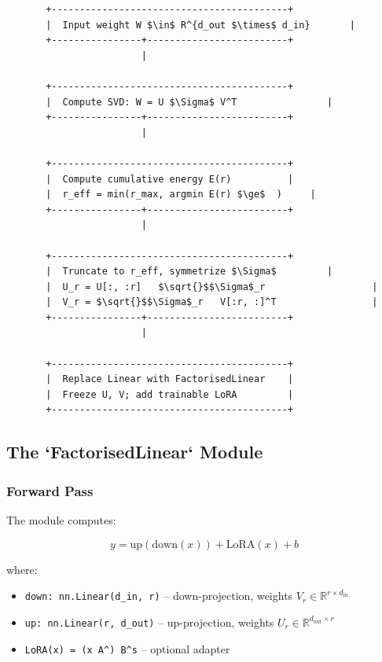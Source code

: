 \begin{lstlisting}
       +------------------------------------------+
       |  Input weight W $\in$ R^{d_out $\times$ d_in}       |
       +----------------+-------------------------+
                        |
                         
       +------------------------------------------+
       |  Compute SVD: W = U $\Sigma$ V^T                |
       +----------------+-------------------------+
                        |
                         
       +------------------------------------------+
       |  Compute cumulative energy E(r)          |
       |  r_eff = min(r_max, argmin E(r) $\ge$  )     |
       +----------------+-------------------------+
                        |
                         
       +------------------------------------------+
       |  Truncate to r_eff, symmetrize $\Sigma$         |
       |  U_r = U[:, :r]   $\sqrt{}$$\Sigma$_r                   |
       |  V_r = $\sqrt{}$$\Sigma$_r   V[:r, :]^T                 |
       +----------------+-------------------------+
                        |
                         
       +------------------------------------------+
       |  Replace Linear with FactorisedLinear    |
       |  Freeze U, V; add trainable LoRA         |
       +------------------------------------------+
\end{lstlisting}

\subsection{The `FactorisedLinear` Module}

\subsubsection{Forward Pass}

The module computes:

\[
y = \text{up}(\text{down}(x)) + \text{LoRA}(x) + b
\tag{4.2}
\]

where:

\begin{itemize}
\item \texttt{down: nn.Linear(d\_in, r)} -- down-projection, weights $V_r \in \mathbb{R}^{r \times d_\text{in}}$
\item \texttt{up: nn.Linear(r, d\_out)} -- up-projection, weights $U_r \in \mathbb{R}^{d_\text{out} \times r}$
\item \texttt{LoRA(x) = (x A^\top) B^\top \cdot s} -- optional adapter

\end{itemize}
